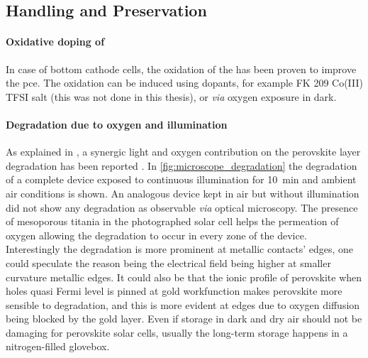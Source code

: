 		\FloatBarrier
	\subsection{Handling and Preservation}

		\paragraph{Oxidative doping of }
		In case of bottom cathode cells, the oxidation of the  has been proven to improve the \gls{pce}.
		The oxidation can be induced using dopants, for example FK 209 Co(III) TFSI salt\cite{Burschka2013} (this was not done in this thesis), or \textsl{via} oxygen exposure in dark.

		\paragraph{Degradation due to oxygen and illumination}\label{methods_degradation}
		As explained in , a synergic light and oxygen contribution on the perovskite layer degradation has been reported \cite{Senocrate2018a,Aristidou2017}.
		In \cref{fig:microscope_degradation} the degradation of a complete device exposed to continuous illumination for \SI{10}{\minute} and ambient air conditions is shown.
		An analogous device kept in air but without illumination did not show any degradation as observable \textsl{via} optical microscopy.
		The presence of mesoporous titania in the photographed solar cell helps the permeation of oxygen allowing the degradation to occur in every zone of the device.
		Interestingly the degradation is more prominent at metallic contacts' edges, one could speculate the reason being the electrical field being higher at smaller curvature metallic edges.
		It could also be that the ionic profile of perovskite when holes quasi Fermi level is pinned at gold workfunction makes perovskite more sensible to degradation, and this is more evident at edges due to oxygen diffusion being blocked by the gold layer.
		Even if storage in dark and dry air should not be damaging for perovskite solar cells, usually the long-term storage happens in a nitrogen-filled glovebox.


